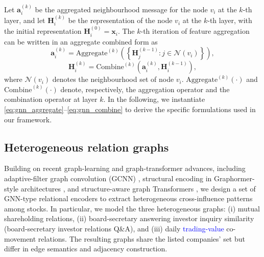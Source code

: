 \documentclass[pdflatex,sn-mathphys-num]{sn-jnl}%
\theoremstyle{thmstyleone}%
\theoremstyle{thmstyletwo}%
\theoremstyle{thmstylethree}%
\begin{document}
Let $\mathbf{a}_i^{(k)}$ be the aggregated neighbourhood message for the node $v_i$ at the $k$-th layer, and let $\mathbf{H}_i^{(k)}$ be the representation of the node $v_i$ at the $k$-th layer, with the initial representation $\mathbf{H}_i^{(0)}=\mathbf{x}_i$.
The $k$-th iteration of feature aggregation can be written in an aggregate combined form as
\begin{equation}
\mathbf{a}_i^{(k)}=\mathrm{Aggregate}^{(k)}\!\left(\left\{\mathbf{H}_j^{(k-1)}: j\in \mathcal{N}(v_i)\right\}\right),
\label{eq:gnn_aggregate}
\end{equation}
\begin{equation}
\mathbf{H}_i^{(k)}=\mathrm{Combine}^{(k)}\!\left(\mathbf{a}_i^{(k)}, \mathbf{H}_i^{(k-1)}\right),
\label{eq:gnn_combine}
\end{equation}
where $\mathcal{N}(v_i)$ denotes the neighbourhood set of node $v_i$.
$\mathrm{Aggregate}^{(k)}(\cdot)$ and $\mathrm{Combine}^{(k)}(\cdot)$ denote, respectively, the aggregation operator and the combination operator at layer $k$.
In the following, we instantiate \eqref{eq:gnn_aggregate}--\eqref{eq:gnn_combine} to derive the specific formulations used in our framework.

\subsection{Heterogeneous relation graphs}\label{Heterogeneous relation graphs}

Building on recent graph-learning and graph-transformer advances, including adaptive-filter graph convolution (GCNN) \citep{Andrea2023AdaptiveFiltersGCNN}, structural encoding in Graphormer-style architectures \citep{Ying2021NeurIPSTransformersGraph}, and structure-aware graph Transformers \citep{Chen2022StructureAwareTransformerGraphs}, we design a set of GNN-type relational encoders to extract heterogeneous cross-influence patterns among stocks. In particular, we model the three heterogeneous graphs: (i) mutual shareholding relations, (ii)  board-secretary answering investor inquiry similarity (board-secretary investor relations Q\&A), and (iii) daily \textcolor{blue}{trading-value} co-movement relations. The resulting graphs share the listed companies' set but differ in edge semantics and adjacency construction.
\end{document}
